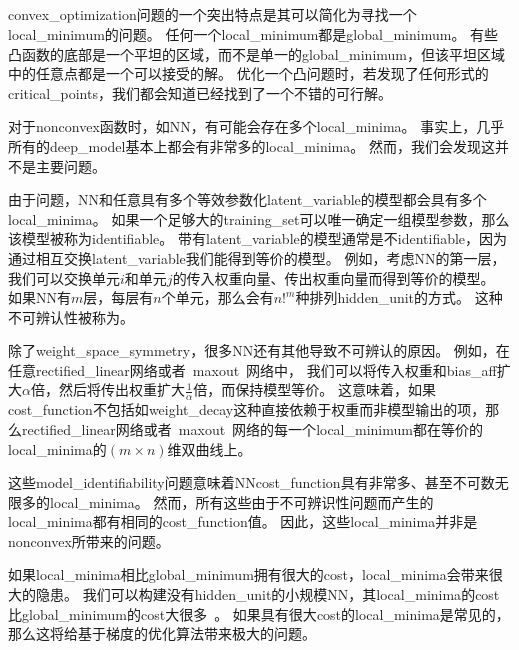 \subsection{}
\label{sec:local_minima}
\gls{convex_optimization}问题的一个突出特点是其可以简化为寻找一个\gls{local_minimum}的问题。
任何一个\gls{local_minimum}都是\gls{global_minimum}。
有些凸函数的底部是一个平坦的区域，而不是单一的\gls{global_minimum}，但该平坦区域中的任意点都是一个可以接受的解。
优化一个凸问题时，若发现了任何形式的\gls{critical_points}，我们都会知道已经找到了一个不错的可行解。


对于\gls{nonconvex}函数时，如\gls{NN}，有可能会存在多个\gls{local_minima}。
事实上，几乎所有的\gls{deep_model}基本上都会有非常多的\gls{local_minima}。
然而，我们会发现这并不是主要问题。


由于问题，\gls{NN}和任意具有多个等效参数化\gls{latent_variable}的模型都会具有多个\gls{local_minima}。
如果一个足够大的\gls{training_set}可以唯一确定一组模型参数，那么该模型被称为\gls{identifiable}。
带有\gls{latent_variable}的模型通常是不\gls{identifiable}，因为通过相互交换\gls{latent_variable}我们能得到等价的模型。
例如，考虑\gls{NN}的第一层，我们可以交换单元$i$和单元$j$的传入权重向量、传出权重向量而得到等价的模型。
如果\gls{NN}有$m$层，每层有$n$个单元，那么会有$n!^m$种排列\gls{hidden_unit}的方式。
这种不可辨认性被称为。


除了\gls{weight_space_symmetry}，很多\gls{NN}还有其他导致不可辨认的原因。
例如，在任意\gls{rectified_linear}网络或者~\gls{maxout}~网络中，
我们可以将传入权重和\gls{bias_aff}扩大$\alpha$倍，然后将传出权重扩大$\frac{1}{\alpha}$倍，而保持模型等价。
这意味着，如果\gls{cost_function}不包括如\gls{weight_decay}这种直接依赖于权重而非模型输出的项，那么\gls{rectified_linear}网络或者~\gls{maxout}~网络的每一个\gls{local_minimum}都在等价的\gls{local_minima}的$(m\times n)$维双曲线上。


这些\gls{model_identifiability}问题意味着\gls{NN}\gls{cost_function}具有非常多、甚至不可数无限多的\gls{local_minima}。
然而，所有这些由于不可辨识性问题而产生的\gls{local_minima}都有相同的\gls{cost_function}值。
因此，这些\gls{local_minima}并非是\gls{nonconvex}所带来的问题。


如果\gls{local_minima}相比\gls{global_minimum}拥有很大的\gls{cost}，\gls{local_minima}会带来很大的隐患。
我们可以构建没有\gls{hidden_unit}的小规模\gls{NN}，其\gls{local_minima}的\gls{cost}比\gls{global_minimum}的\gls{cost}大很多~\citep{Sontag-Sussman-1989,Brady-et-al-1989,Gori-Tesi-1992}。
如果具有很大\gls{cost}的\gls{local_minima}是常见的，那么这将给基于梯度的优化算法带来极大的问题。



